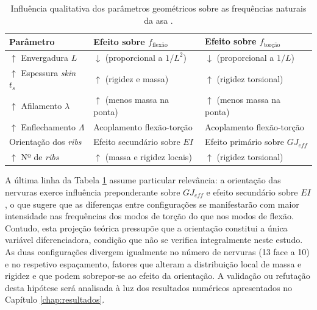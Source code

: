 \documentclass[11pt,oneside,a4paper,final]{report}
\begin{document}
\begin{table}[H]
\centering
\caption{Influência qualitativa dos parâmetros geométricos sobre as frequências naturais da asa \cite{Wright2015, Megson2012, Bisplinghoff1996}.}
\label{tab:efeitos_geometricos}
\renewcommand{\arraystretch}{1.5}
\begin{tabularx}{\textwidth}{l >{\raggedright\arraybackslash}X >{\raggedright\arraybackslash}X}
\toprule
\textbf{Parâmetro} & \textbf{Efeito sobre $f_{\text{flexão}}$} & \textbf{Efeito sobre $f_{\text{torção}}$} \\
\midrule
$\uparrow$ Envergadura $L$           & $\downarrow$ (proporcional a $1/L^2$) & $\downarrow$ (proporcional a $1/L$) \\
$\uparrow$ Espessura \textit{skin} $t_s$ & $\uparrow$ (rigidez e massa)          & $\uparrow$ (rigidez torsional) \\
$\uparrow$ Afilamento $\lambda$      & $\uparrow$ (menos massa na ponta)     & $\uparrow$ (menos massa na ponta) \\
$\uparrow$ Enflechamento $\Lambda$   & Acoplamento flexão-torção             & Acoplamento flexão-torção \\
Orientação dos \textit{ribs}         & Efeito secundário sobre $EI$          & Efeito primário sobre $GJ_{eff}$ \\
$\uparrow$ Nº de \textit{ribs}       & $\uparrow$ (massa e rigidez locais)   & $\uparrow$ (rigidez torsional) \\
\bottomrule
\end{tabularx}
\end{table}


A última linha da Tabela \ref{tab:efeitos_geometricos} assume particular relevância: a orientação das nervuras exerce influência preponderante sobre $GJ_{eff}$ e efeito secundário sobre $EI$, o que sugere que as diferenças entre configurações se manifestarão com maior intensidade nas frequências dos modos de torção do que nos modos de flexão. Contudo, esta projeção teórica pressupõe que a orientação constitui a única variável diferenciadora, condição que não se verifica integralmente neste estudo. As duas configurações divergem igualmente no número de nervuras (13 face a 10) e no respetivo espaçamento, fatores que alteram a distribuição local de massa e rigidez e que podem sobrepor-se ao efeito da orientação. A validação ou refutação desta hipótese será analisada à luz dos resultados numéricos apresentados no Capítulo \ref{chap:resultados}.
\end{document}
